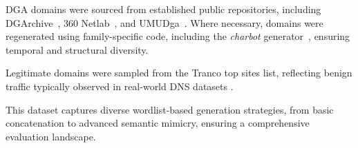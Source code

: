 \documentclass[a4paper]{llncs}
\begin{document}
\begin{table}[h]
\centering
\caption{Detailed composition of the dataset used for model training and evaluation. The table lists the wordlist-based DGA families used for training and generalization testing, along with the corresponding number of samples. Legitimate domains were included to simulate real network traffic and were split into training and testing subsets accordingly.}
\label{tab:dataset_composition}
\end{table}

DGA domains were sourced from established public repositories, including DGArchive~\cite{plohmann2015dgaarchive}, 360 Netlab~\cite{360netlab}, and UMUDga~\cite{zago2020umudga}. Where necessary, domains were regenerated using family-specific code, including the \textit{charbot} generator~\cite{peck2019charbot}, ensuring temporal and structural diversity.

Legitimate domains were sampled from the Tranco top sites list, reflecting benign traffic typically observed in real-world DNS datasets \cite{tranco}.

This dataset captures diverse wordlist-based generation strategies, from basic concatenation to advanced semantic mimicry, ensuring a comprehensive evaluation landscape.
\end{document}
